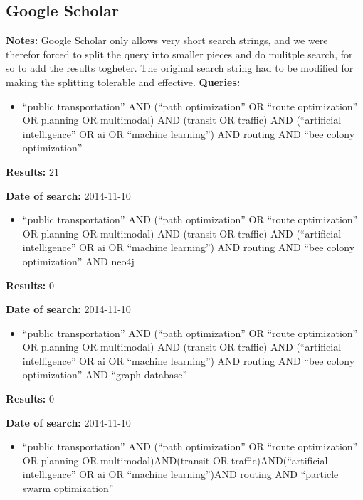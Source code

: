 \subsection{Google Scholar}
\par \textbf{Notes:} Google Scholar only allows very short search strings, and we were therefor forced to split the query into smaller pieces and do mulitple search, for so to add the results togheter. The original search string had to be modified for making the splitting tolerable and effective. 
\newline
\newline
\textbf{Queries:}
\begin{itemize}
	\item ``public transportation'' AND (``path optimization'' OR ``route optimization'' OR planning OR multimodal) AND (transit OR traffic) AND (``artificial intelligence'' OR ai OR ``machine learning'') AND routing AND ``bee colony optimization''
\end{itemize}
\par \textbf{Results:} 21
\par \textbf{Date of search:} 2014-11-10 
\begin{itemize}
	\item ``public transportation'' AND (``path optimization'' OR ``route optimization'' OR planning OR multimodal) AND (transit OR traffic) AND (``artificial intelligence'' OR ai OR ``machine learning'') AND routing AND ``bee colony optimization'' AND neo4j
\end{itemize}
\par \textbf{Results:} 0
\par \textbf{Date of search:} 2014-11-10
\begin{itemize}
	\item ``public transportation'' AND (``path optimization'' OR ``route optimization'' OR planning OR multimodal) AND (transit OR traffic) AND (``artificial intelligence'' OR ai OR ``machine learning'') AND routing AND ``bee colony optimization'' AND ``graph database''
\end{itemize}
\par \textbf{Results:} 0
\par \textbf{Date of search:} 2014-11-10
\begin{itemize}
	\item ``public transportation'' AND (``path optimization'' OR ``route optimization'' OR planning OR multimodal)AND(transit OR traffic)AND(``artificial intelligence'' OR ai OR ``machine learning'')AND routing AND ``particle swarm optimization''
\end{itemize}

